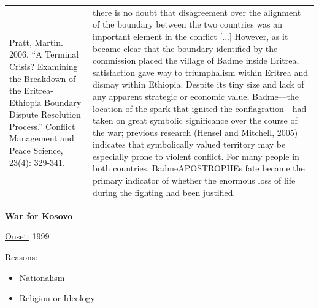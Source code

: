{\begin{longtable}{p{}p{}}
Pratt, Martin. 2006. “A Terminal Crisis? Examining the Breakdown of the Eritrea-Ethiopia Boundary Dispute Resolution Process.” Conflict Management and Peace Science, 23(4): 329-341. & there is no doubt that disagreement over the alignment of the boundary between the two countries was an important element in the conflict [...] However, as it became clear that the boundary identified by the commission placed the village of Badme inside Eritrea, satisfaction gave way to triumphalism within Eritrea and dismay within Ethiopia. Despite its tiny size and lack of any apparent strategic or economic value, Badme—the location of the spark that ignited the conflagration—had taken on great symbolic significance over the course of the war; previous research (Hensel and Mitchell, 2005) indicates that symbolically valued territory may be especially prone to violent conflict. For many people in both countries, BadmeAPOSTROPHEs fate became the primary indicator of whether the enormous loss of life during the fighting had been justified.
\\
\end{longtable}}
\clearpage
         \textbf{War for Kosovo} 

          \underline{Onset:} 1999         

\underline{Reasons:}
\begin{itemize}
\item Nationalism
\item Religion or Ideology
\end{itemize}

